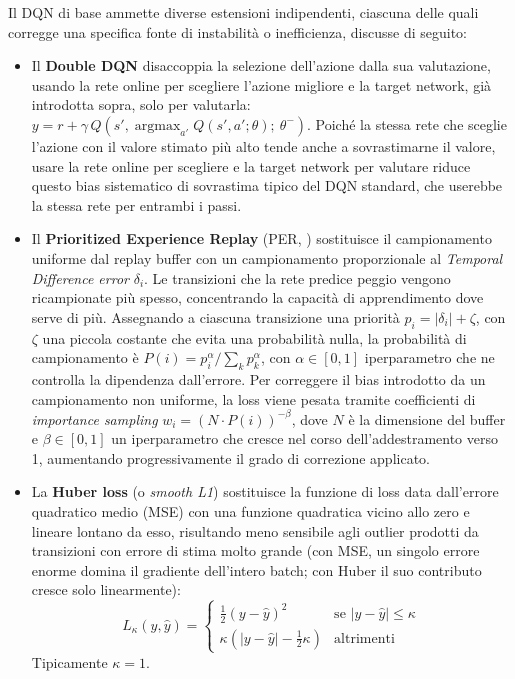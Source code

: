 Il DQN di base ammette diverse estensioni indipendenti, ciascuna delle
quali corregge una specifica fonte di instabilità o inefficienza,
discusse di seguito:
\begin{itemize}
  \item Il \textbf{Double DQN} \citep{vanhasselt2016double} disaccoppia la
        selezione dell'azione dalla sua valutazione, usando la rete online per
        scegliere l'azione migliore e la target network, già introdotta sopra, solo
        per valutarla:
        $y = r + \gamma\, Q\!\left(s', \operatorname*{argmax}_{a'}
          Q(s',a';\theta);\ \theta^-\right)$. Poiché la stessa rete che sceglie
        l'azione con il valore stimato più alto tende anche a sovrastimarne il
        valore, usare la rete online per scegliere e la target network per
        valutare riduce questo bias sistematico di sovrastima tipico del DQN
        standard, che userebbe la stessa rete per entrambi i passi.
  \item Il \textbf{Prioritized Experience Replay} (PER,
        \citealp{schaul2016per}) sostituisce il campionamento uniforme dal
        replay buffer con un campionamento proporzionale al \emph{Temporal Difference error} $\delta_i$.
        Le transizioni che la rete predice peggio vengono ricampionate più
        spesso, concentrando la capacità di apprendimento dove serve di più.
        Assegnando a ciascuna transizione una priorità $p_i = |\delta_i| +
          \zeta$, con $\zeta$ una piccola costante che evita una probabilità
        nulla, la probabilità di campionamento è $P(i) = p_i^\alpha /
          \sum_k p_k^\alpha$, con $\alpha \in [0,1]$ iperparametro che ne
        controlla la dipendenza dall'errore. Per correggere il bias introdotto
        da un campionamento non uniforme, la loss viene pesata tramite
        coefficienti di \emph{importance sampling} $w_i = \left(N \cdot
          P(i)\right)^{-\beta}$, dove $N$ è la dimensione del buffer e $\beta \in
          [0,1]$ un iperparametro che cresce nel corso dell'addestramento verso
        1, aumentando progressivamente il grado di correzione applicato.
  \item La \textbf{Huber loss} (o \emph{smooth L1}) sostituisce la funzione di loss data dall'errore
        quadratico medio (MSE) con una funzione quadratica vicino allo zero e
        lineare lontano da esso, risultando meno sensibile agli outlier
        prodotti da transizioni con errore di stima molto grande (con MSE, un
        singolo errore enorme domina il gradiente dell'intero batch; con Huber
        il suo contributo cresce solo linearmente):
        \begin{equation}
          L_\kappa(y, \hat y) =
          \begin{cases}
            \tfrac{1}{2}(y-\hat y)^2                           & \text{se } |y-\hat y| \le \kappa \\
            \kappa\left(|y-\hat y| - \tfrac{1}{2}\kappa\right) & \text{altrimenti}
          \end{cases}
        \end{equation}
        Tipicamente $\kappa = 1$.
\end{itemize}

